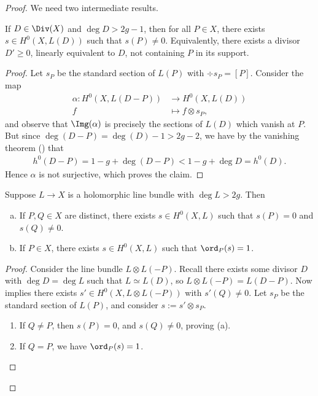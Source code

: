 \documentclass[11pt]{report}
\begin{document}
\begin{proof}
We need two intermediate results.

\begin{prop} \label{prop:embedding-prop-1}
If $D\in \Div(X)$ and $\deg D > 2g-1$, then for all $P \in X$, there exists $s \in H^0(X,L(D))$ such that $s(P) \ne 0$. Equivalently, there exists a divisor $D' \ge 0$, linearly equivalent to $D$, not containing $P$ in its support. 
\end{prop}

\begin{proof}
Let $s_P$ be the standard section of $L(P)$ with $\div s_P=[P]$. Consider the map
\begin{align*}
\alpha : H^0(X,L(D-P)) &\to H^0(X,L(D)) \\
f & \mapsto f \otimes s_P,
\end{align*}
and observe that $\Img(\alpha)$ is precisely the sections of $L(D)$ which vanish at $P$. But since $\deg (D-P)=\deg (D)-1>2g-2$, we have by the vanishing theorem () that
\begin{align*}
h^0(D-P) = 1-g + \deg(D-P) < 1-g + \deg D = h^0(D).
\end{align*}
Hence $\alpha$ is not surjective, which proves the claim.
\end{proof}

\begin{prop} \label{prop:embedding-prop-2}
Suppose $L\to X$ is a holomorphic line bundle with $\deg L >2g$. Then
\begin{enumerate}[(a)]
    \item If $P,Q \in X$ are distinct, there exists $s \in H^0(X,L)$ such that $s(P)=0$ and $s(Q)\ne 0$.
    \item If $P \in X$, there exists $s \in H^0(X,L)$ such that $\ord_P(s)=1$.
\end{enumerate}
\end{prop}

\begin{proof}
Consider the line bundle $L \otimes L(-P)$. Recall there exists some divisor $D$ with $\deg D = \deg L$ such that $L \simeq L(D)$, so $L\otimes L(-P)=L(D-P)$. Now  implies there exists $s' \in H^0(X,L \otimes L(-P))$ with $s'(Q) \ne 0$. Let $s_P$ be the standard section of $L(P)$, and consider $s:= s' \otimes s_P$.
\begin{enumerate}
    \item If $Q \ne P$, then $s(P)=0$, and $s(Q)\ne 0$, proving (a).
    \item If $Q=P$, we have $\ord_P(s)=1$.
\end{enumerate}
\end{proof}


\end{proof}
\end{document}
